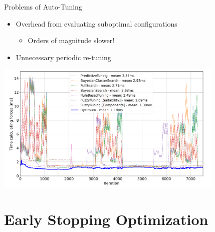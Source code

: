\documentclass[
	10pt,
	t		%
]{beamer}
\begin{document}
\begin{frame}{Problems of Auto-Tuning}
    \begin{itemize}
        \item Overhead from evaluating suboptimal configurations
              \begin{itemize}
                  \item Orders of magnitude slower!
              \end{itemize}
        \item Unnecessary periodic re-tuning
    \end{itemize}
    \begin{center}
        \includegraphics[width=0.82\textwidth]{figures/unnecessary-tuning-phases.png}
    \end{center}
\end{frame}



\section{Early Stopping Optimization}
\end{document}

